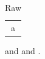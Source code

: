 \documentclass[pmlr]{jmlr}
\begin{document}
\begin{table}\caption{Raw}\label{tab:raw_perf}\centering\begin{tabular}{c}a\end{tabular}\end{table}
 and  and .
\end{document}
